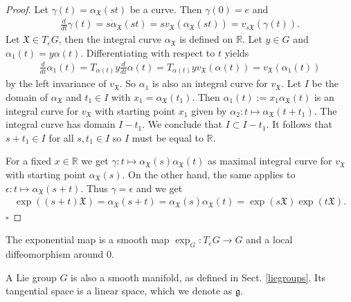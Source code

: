 \documentclass[envcountsect,runningheads]{llncs}
\renewcommand{\qed}{\hfill$\square$}
\begin{document}
\begin{proof}
Let $\gamma(t) = \alpha_{\mathfrak{X}}(st)$ be a curve. Then $\gamma(0) = e$ and
\begin{align}
	\frac{d}{dt}\gamma(t) = s\dot{\alpha}_{\mathfrak{X}}(st) = s v_{\mathfrak{X}}(\alpha_{\mathfrak{X}}(st)) = v_{s\mathfrak{X}}(\gamma(t)).
\end{align}
Let $\mathfrak{X} \in T_eG$, then the integral curve $\alpha_{\mathfrak{X}}$ is defined on $\mathbb{R}$. Let $y \in G$ and $\alpha_1(t) = y\alpha(t)$. Differentiating with respect to $t$ yields
\begin{align}
	\frac{d}{dt}\alpha_{1}(t) = T_{\alpha(t)}y \frac{d}{dt} \alpha(t) = T_{\alpha(t)} y v_{\mathfrak{X}}(\alpha(t)) = v_{\mathfrak{X}}(\alpha_1(t))
\end{align}
by the left invariance of $v_{\mathfrak{X}}$. So $\alpha_1$ is also an integral curve for $v_{\mathfrak{X}}$. Let $I$ be the domain of $\alpha_{\mathfrak{X}}$ and $t_1 \in I$ with $x_1 = \alpha_{\mathfrak{X}}(t_1)$. Then $\alpha_1(t) := x_1 \alpha_{\mathfrak{X}}(t)$ is an integral curve for $v_{\mathfrak{X}}$ with starting point $x_1$ given by $\alpha_2: t \mapsto \alpha_{\mathfrak{X}}(t+t_1)$. The integral curve has domain $I-t_1$. We conclude that $I \subset I-t_1$. It follows that $s+t_1 \in I$ for all $s, t_1 \in I$ so $I$ must be equal to $\mathbb{R}$.

For a fixed $x \in \mathbb{R}$ we get $\gamma: t \mapsto \alpha_{\mathfrak{X}}(s)\alpha_{\mathfrak{X}}(t)$ as maximal integral curve for $v_{\mathfrak{X}}$ with starting point $\alpha_{\mathfrak{X}}(s)$. On the other hand, the same applies to $\epsilon: t \mapsto \alpha_{\mathfrak{X}}(s+t)$. Thus $\gamma = \epsilon$ and we get
\begin{align}
	\exp((s+t)\mathfrak{X}) = \alpha_{\mathfrak{X}}(s+t) = \alpha_{\mathfrak{X}}(s) \alpha_{\mathfrak{X}}(t) = \exp(s\mathfrak{X}) \exp(t\mathfrak{X}).
\end{align} \qed
\end{proof}

\begin{remarkdef}
The exponential map is a smooth map $\exp_G: T_eG \rightarrow G$ and a local diffeomorphism around $0$.
\end{remarkdef}

A Lie group $G$ is also a smooth manifold, as defined in Sect. \ref{liegroups}. Its tangential space is a linear space, which we denote as $\mathfrak{g}$.
\end{document}
